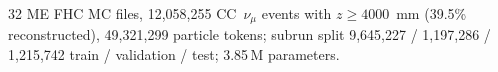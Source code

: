 32 ME FHC MC files, 12{,}058{,}255 CC~$\nu_\mu$ events with $z \ge 4000$~mm (39.5\% reconstructed), 49{,}321{,}299 particle tokens; subrun split 9{,}645{,}227 / 1{,}197{,}286 / 1{,}215{,}742 train / validation / test; 3.85\,M parameters.

